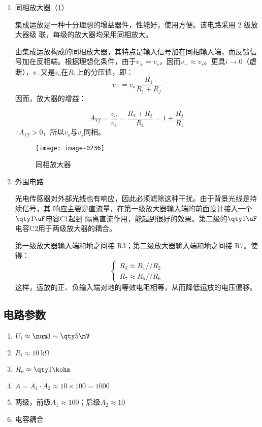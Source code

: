\begin{enumerate}
  \item 同相放大器\cite{cn10}（\cref{4-3}）
  
  集成运放是一种十分理想的增益器件，性能好，使用方便。该电路采用 2 级放大器级
  联，每级的放大器均采用同相放大。

  由集成运放构成的同相放大器，其特点是输入信号加在同相输入端，而反馈信号加在反相端。根据理想化条件，由于$v_+=v_s$，因而$v_-\approx v_s$。更具$i\to0$（虚断），$v_-$又是$v_o$在$R_1$上的分压值，即：
  \begin{equation}
    v_-=v_o\frac{R_1}{R_1+R_f}
  \end{equation}
  因而，放大器的增益：
  
  \begin{equation}
    A_{Vf}=\frac{v_o}{v_s}=\frac{R_1+R_f}{R_1}=1+\frac{R_f}{R_1}
  \end{equation}
  $\because A_{Vf}>0$，所以$v_o$与$v_s$同相。
  
  \begin{figure}[htbp]
    \centering
    \texttt{[image: image-0236]}
    \caption{同相放大器}
    \label{4-3}
  \end{figure}
  \item 外围电路
  
  光电传感器对外部光线也有响应，因此必须滤除这种干扰。由于背景光线是持续信号，其
  响应主要是直流量，在第一级放大器输入端的前面设计接入一个$\qty1\uF$电容C1起到
  隔离直流作用，能起到很好的效果。第二级的$\qty1\uF$电容C2用于两级放大器的耦合。

  第一级放大器输入端和地之间接 R3；第二级放大器输入端和地之间接 R7。使得：
  \begin{equation}
    \begin{cases}
      R_3\approx R_1//R_2\\
      R_7\approx R_5//R_6
    \end{cases}
  \end{equation}
  这样，运放的正、负输入端对地的等效电阻相等，从而降低运放的电压偏移。
\end{enumerate}

\subsection{电路参数}

\begin{enumerate}
  \item {} $U_i\approx\num3\sim\qty5\mV$
  \item {} $R_i\approx\qty{10}\kohm$
  \item {} $R_o\approx\qty1\kohm$
  \item {} $A=A_1\cdot A_2\approx10\times100=1000$
  \item {} 两级，前级$A_1\approx100$；后级$A_2\approx10$
  \item {} 电容耦合
\end{enumerate}

